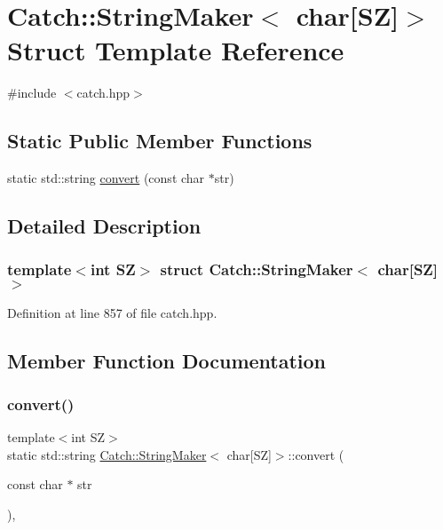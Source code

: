 \hypertarget{struct_catch_1_1_string_maker_3_01char[_s_z]_4}{}\section{Catch\+:\+:String\+Maker$<$ char\mbox{[}SZ\mbox{]}$>$ Struct Template Reference}
\label{struct_catch_1_1_string_maker_3_01char[_s_z]_4}


{\ttfamily \#include $<$catch.\+hpp$>$}

\subsection*{Static Public Member Functions}
\begin{DoxyCompactItemize}
\item 
static std\+::string \mbox{\hyperlink{struct_catch_1_1_string_maker_3_01char[_s_z]_4_ab4938ae9fbc5e01cf6a3be615519cefd}{convert}} (const char $\ast$str)
\end{DoxyCompactItemize}


\subsection{Detailed Description}
\subsubsection*{template$<$int SZ$>$\newline
struct Catch\+::\+String\+Maker$<$ char\mbox{[}\+S\+Z\mbox{]}$>$}



Definition at line 857 of file catch.\+hpp.



\subsection{Member Function Documentation}
\mbox{\label{struct_catch_1_1_string_maker_3_01char[_s_z]_4_ab4938ae9fbc5e01cf6a3be615519cefd}} 
\subsubsection{\texorpdfstring{convert()}{convert()}}
{\footnotesize\ttfamily template$<$int SZ$>$ \\
static std\+::string \mbox{\hyperlink{struct_catch_1_1_string_maker}{Catch\+::\+String\+Maker}}$<$ char\mbox{[}SZ\mbox{]}$>$\+::convert (\begin{DoxyParamCaption}\item[{const char $\ast$}]{str }\end{DoxyParamCaption})\hspace{0.3cm}{\ttfamily [inline]}, {\ttfamily [static]}}



